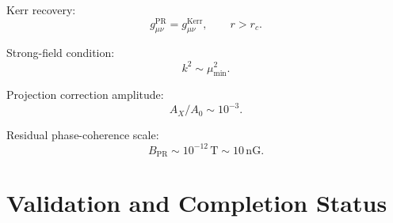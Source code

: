 \documentclass[11pt]{article}
\newcommand{\PR}{\mathrm{PR}}
\newcommand{\Kerr}{\mathrm{Kerr}}
\begin{document}
Kerr recovery:
\begin{equation}
g_{\mu\nu}^{\PR}=g_{\mu\nu}^{\Kerr},
\qquad
r>r_c.
\end{equation}

Strong-field condition:
\begin{equation}
k^2\sim\mu_{\min}^2.
\end{equation}

Projection correction amplitude:
\begin{equation}
\boxed{
A_X/A_0\sim10^{-3}.
}
\end{equation}

Residual phase-coherence scale:
\begin{equation}
\boxed{
B_{\PR}\sim10^{-12}\,\mathrm T\sim10\,\mathrm{nG}.
}
\end{equation}


\section{Validation and Completion Status}
\end{document}
